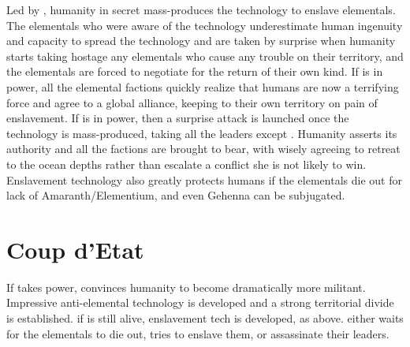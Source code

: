 \documentclass[green]{elementals}
\begin{document}
Led by \cMS{\intro}, humanity in secret mass-produces the technology to enslave elementals. The elementals who were aware of the technology underestimate human ingenuity and capacity to spread the technology and are taken by surprise when humanity starts taking hostage any elementals who cause any trouble on their territory, and the elementals are forced to negotiate for the return of their own kind. If \cLeader{\intro} is in power, all the elemental factions quickly realize that humans are now a terrifying force and agree to a global alliance, keeping to their own territory on pain of enslavement. If \cDema{\intro} is in power, then a surprise attack is launched once the technology is mass-produced, taking all the leaders except \cWaterQueen{}. Humanity asserts its authority and all the factions are brought to bear, with \cWaterQueen{} wisely agreeing to retreat to the ocean depths rather than escalate a conflict she is not likely to win. Enslavement technology also greatly protects humans if the elementals die out for lack of Amaranth/Elementium, and even Gehenna can be subjugated.

\section{Coup d'Etat}

If \cDema{\intro} takes power, \cDema{\they} convinces humanity to become dramatically more militant. Impressive anti-elemental technology is developed and a strong territorial divide is established. if \cMS{\intro} is still alive, enslavement tech is developed, as above. \cDema{} either waits for the elementals to die out, tries to enslave them, or assassinate their leaders.
\end{document}
